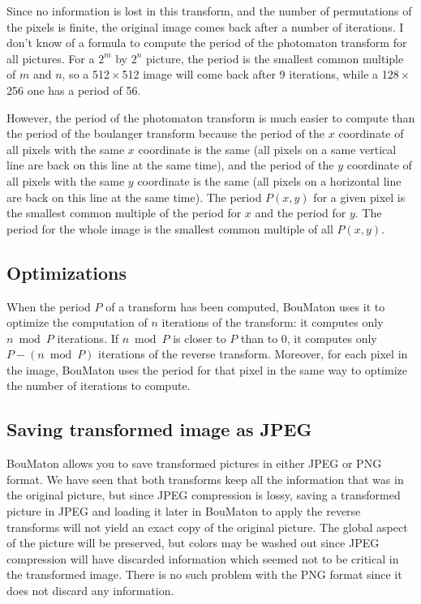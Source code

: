 \documentclass[a4paper]{article}
\newcommand{\BouMaton}{\textsf{BouMaton}\xspace}
\newcommand{\picdim}[2]{#1\,\(\times\)\,#2}
\begin{document}
  Since no information is lost in this transform, and the number of
  permutations of the pixels is finite, the original image comes back
  after a number of iterations. I don't know of a formula to compute
  the period of the photomaton transform for all pictures. For a
  \(2^m\) by \(2^n\) picture, the period is the smallest common
  multiple of \(m\) and \(n\), so a \picdim{512}{512} image will come
  back after 9 iterations, while a \picdim{128}{256} one has a period
  of 56.
  
  However, the period of the photomaton transform is much easier to
  compute than the period of the boulanger transform because the
  period of the \(x\) coordinate of all pixels with the same \(x\)
  coordinate is the same (all pixels on a same vertical line are back
  on this line at the same time), and the period of the \(y\)
  coordinate of all pixels with the same \(y\) coordinate is the same 
  (all pixels on a horizontal line are back on this line at the same 
  time).
  The period \(P(x,y)\) for a given pixel is the smallest common
  multiple of the period for \(x\) and the period for \(y\). The
  period for the whole image is the smallest common multiple of all
  \(P(x,y)\).
  
  \subsection{Optimizations}
  When the period \(P\) of a transform has been computed, \BouMaton
  uses it to optimize the computation of \(n\) iterations of the
  transform: it computes only \(n \bmod P\) iterations.  If \(n \bmod
  P\) is closer to \(P\) than to 0, it computes only \(P - (n \bmod
  P)\) iterations of the reverse transform.  Moreover, for each pixel
  in the image, \BouMaton uses the period for that pixel in the same
  way to optimize the number of iterations to compute.
  
  \subsection{Saving transformed image as JPEG}
  \BouMaton allows you to save transformed pictures in either JPEG or PNG
  format.  We have seen that both transforms keep all the information
  that was in the original picture, but since JPEG compression is
  lossy, saving a transformed picture in JPEG and loading it later in
  \BouMaton to apply the reverse transforms will not yield an exact
  copy of the original picture.  The global aspect of the picture will
  be preserved, but colors may be washed out since JPEG compression
  will have discarded information which seemed not to be critical in
  the transformed image. There is no such problem with the PNG format 
  since it does not discard any information. 
\end{document}
